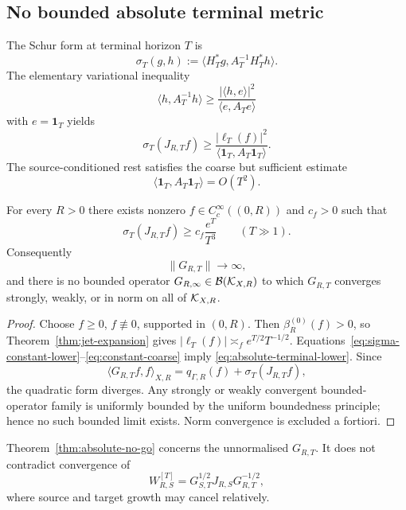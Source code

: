 \subsection{No bounded absolute terminal metric}

The Schur form at terminal horizon $T$ is
\[
 \sigma_T(g,h)
 :=\langle H_T^*g,A_T^{-1}H_T^*h\rangle.
\tag{DT.9}\label{eq:terminal-sigma}
\]
The elementary variational inequality
\[
 \langle h,A_T^{-1}h\rangle
 \ge\frac{|\langle h,e\rangle|^2}{\langle e,A_Te\rangle}
\tag{DT.10}\label{eq:variational-lower}
\]
with $e=\mathbf1_T$ yields
\[
 \sigma_T(J_{R,T}f)
 \ge\frac{|\ell_T(f)|^2}{\langle\mathbf1_T,A_T\mathbf1_T\rangle}.
\tag{DT.11}\label{eq:sigma-constant-lower}
\]
The source-conditioned rest satisfies the coarse but sufficient estimate
\[
 \langle\mathbf1_T,A_T\mathbf1_T\rangle=O(T^2).
\tag{DT.12}\label{eq:constant-coarse}
\]

\begin{theorem}\label{thm:absolute-no-go}
For every $R>0$ there exists nonzero $f\in C_c^\infty((0,R))$ and $c_f>0$ such that
\[
 \boxed{
 \sigma_T(J_{R,T}f)\ge c_f\frac{e^T}{T^3}
 \qquad(T\gg1).
 }
\tag{DT.13}\label{eq:absolute-terminal-lower}
\]
Consequently
\[
 \|G_{R,T}\|\longrightarrow\infty,
\]
and there is no bounded operator $G_{R,\infty}\in\mathcal B(\mathcal K_{X,R})$ to which
$G_{R,T}$ converges strongly, weakly, or in norm on all of $\mathcal K_{X,R}$.
\end{theorem}

\begin{proof}
Choose $f\ge0$, $f\not\equiv0$, supported in $(0,R)$.  Then
$\beta_R^{(0)}(f)>0$, so Theorem~\ref{thm:jet-expansion} gives
$|\ell_T(f)|\asymp_f e^{T/2}T^{-1/2}$.  Equations~\eqref{eq:sigma-constant-lower}--\eqref{eq:constant-coarse} imply
\eqref{eq:absolute-terminal-lower}.  Since
\[
 \langle G_{R,T}f,f\rangle_{X,R}
 =q_{\Gamma,R}(f)+\sigma_T(J_{R,T}f),
\]
the quadratic form diverges.  Any strongly or weakly convergent bounded-operator family
is uniformly bounded by the uniform boundedness principle; hence no such bounded limit
exists.  Norm convergence is excluded a fortiori.
\end{proof}

\begin{remark}\label{rem:absolute-relative}
Theorem~\ref{thm:absolute-no-go} concerns the unnormalised $G_{R,T}$.  It does not
contradict convergence of
\[
 W_{R,S}^{[T]}=G_{S,T}^{1/2}J_{R,S}G_{R,T}^{-1/2},
\]
where source and target growth may cancel relatively.
\end{remark}


